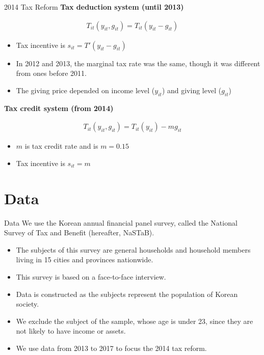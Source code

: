 \documentclass[
  ignorenonframetext,
  aspectratio=169,
]{beamer}
\providecommand{\tightlist}{%
  \setlength{\itemsep}{0pt}\setlength{\parskip}{0pt}}
\begin{document}
\begin{frame}{2014 Tax Reform}
\protect\hypertarget{tax-reform-1}{}
\textbf{Tax deduction system (until 2013)}

\begin{align}
  T_{it}(y_{it}, g_{it}) = T_{it}(y_{it} - g_{it})
\end{align}

\begin{itemize}
\tightlist
\item
  Tax incentive is \(s_{it} = T'(y_{it} - g_{it})\)
\item
  In 2012 and 2013, the marginal tax rate was the same, though it was different from ones before 2011.
\item
  The giving price depended on income level (\(y_{it}\)) and giving level (\(g_{it}\))
\end{itemize}

\textbf{Tax credit system (from 2014)}

\begin{align}
  T_{it}(y_{it}, g_{it}) = T_{it}(y_{it}) - m g_{it}
\end{align}

\begin{itemize}
\tightlist
\item
  \(m\) is tax credit rate and is \(m = 0.15\)
\item
  Tax incentive is \(s_{it} = m\)
\end{itemize}
\end{frame}

\hypertarget{data}{%
\section{Data}\label{data}}

\begin{frame}{Data}
\protect\hypertarget{data-1}{}
We use the Korean annual financial panel survey,
called the National Survey of Tax and Benefit (hereafter, NaSTaB).

\begin{itemize}
\tightlist
\item
  The subjects of this survey are general households and household members living in 15 cities and provinces nationwide.
\item
  This survey is based on a face-to-face interview.
\item
  Data is constructed as the subjects represent the population of Korean society.
\item
  We exclude the subject of the sample, whose age is under 23, since they are not likely to have income or assets.
\item
  We use data from 2013 to 2017 to focus the 2014 tax reform.
\end{itemize}
\end{frame}
\end{document}
